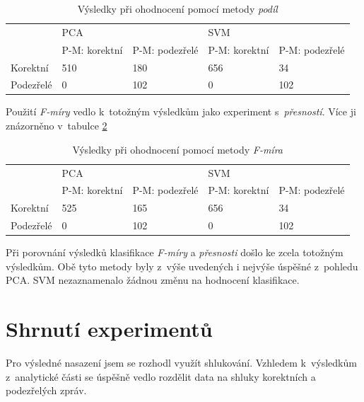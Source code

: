 \documentclass[thesis=M,czech]{FITthesis}[2012/10/20]
\begin{document}
			\begin{table}[htb]\centering
				\centering
				\caption{Výsledky při ohodnocení pomocí metody \textit{podíl}}
				\label{table:anomaly_recall}
				\begin{tabular}{|l|l|l|l|l|}
					\hline
					\multirow{2}{*}{} & \multicolumn{2}{l|}{PCA}                 & \multicolumn{2}{l|}{SVM}                 \\ 
					& P-M: korektní & P-M: podezřelé & P-M: korektní & P-M: podezřelé \\ \hline
					Korektní          & 510                & 180                 & 656                & 34                  \\ \hline
					Podezřelé         & 0                  & 102                 & 0                  & 102                 \\ \hline
				\end{tabular}
			\end{table}
		
			Použití \textit{F-míry} vedlo k~totožným výsledkům jako experiment s~\textit{přesností}. Více ji znázorněno v~tabulce \ref{table:anomaly_f-score}
		
			\begin{table}[htb]\centering
				\centering
				\caption{Výsledky při ohodnocení pomocí metody \textit{F-míra}}
				\label{table:anomaly_f-score}
				\begin{tabular}{|l|l|l|l|l|}
					\hline
					\multirow{2}{*}{} & \multicolumn{2}{l|}{PCA}                 & \multicolumn{2}{l|}{SVM}                 \\ 
					& P-M: korektní & P-M: podezřelé & P-M: korektní & P-M: podezřelé \\ \hline
					Korektní          & 525                & 165                 & 656                & 34                  \\ \hline
					Podezřelé         & 0                  & 102                 & 0                  & 102                 \\ \hline
				\end{tabular}
			\end{table}
		
			Při porovnání výsledků klasifikace \textit{F-míry} a \textit{přesnosti} došlo ke zcela totožným výsledkům. Obě tyto metody byly z~výše uvedených i nejvýše úspěšné z~pohledu PCA. SVM nezaznamenalo žádnou změnu na hodnocení klasifikace.
		
			
	
		\section{Shrnutí experimentů}
			Pro výsledné nasazení jsem se rozhodl využít shlukování. Vzhledem k~výsledkům z~analytické části se úspěšně vedlo rozdělit data na shluky korektních a podezřelých zpráv.
			
\end{document}
